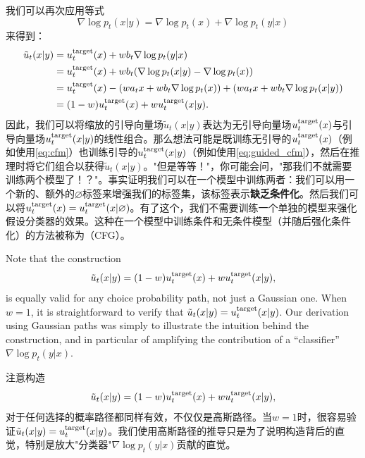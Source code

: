 我们可以再次应用等式$$\nabla \log p_t(x|y) = \nabla \log p_t(x) + \nabla \log p_t(y|x)$$来得到：
\begin{align*}\tilde{u}_t(x|y) &= u^{\text{target}}_t(x) + w b_t \nabla \log p_t(y|x)\\
&= u^{\text{target}}_t(x) + w b_t (\nabla \log p_t(x|y) - \nabla \log p_t(x))\\
&= u^{\text{target}}_t(x) - (w a_tx + w b_t \nabla \log p_t(x)) + (w a_t x + w b_t \nabla \log p_t(x|y))\\
&= (1-w) u^{\text{target}}_t(x) + w u^{\text{target}}_t(x|y).\end{align*}
因此，我们可以将缩放的引导向量场$\tilde{u}_t(x|y)$表达为无引导向量场$u^{\text{target}}_t(x)$与引导向量场$u^{\text{target}}_t(x|y)$的线性组合。那么想法可能是既训练无引导的$u^{\text{target}}_t(x)$（例如使用\cref{eq:cfm}）也训练引导的$u^{\text{target}}_t(x|y)$（例如使用\cref{eq:guided_cfm}），然后在推理时将它们组合以获得$\tilde{u}_t(x|y)$。"但是等等！"，你可能会问，"那我们不就需要训练两个模型了！？"。事实证明我们可以在一个模型中训练两者：我们可以用一个新的、额外的$\varnothing$标签来增强我们的标签集，该标签表示\textbf{缺乏条件化}。然后我们可以将$u^{\text{target}}_t(x)=u^{\text{target}}_t(x|\varnothing)$。有了这个，我们不需要训练一个单独的模型来强化假设分类器的效果。这种在一个模型中训练条件和无条件模型（并随后强化条件化）的方法被称为（CFG）\cite{cfg}。 

\begin{remarkbox}
Note that the construction
\begin{equation*}
    \tilde{u}_t(x|y) = (1-w) u^{\text{target}}_t(x) + w u^{\text{target}}_t(x|y),
\end{equation*}
is equally valid for any choice probability path, not just a Gaussian one. When $w=1$, it is straightforward to verify that $\tilde{u}_t(x|y)=u^{\text{target}}_t(x|y)$. Our derivation using Gaussian paths was simply to illustrate the intuition behind the construction, and in particular of amplifying the contribution of a ``classifier'' $\nabla \log p_t(y|x)$.
\end{remarkbox}
\begin{remarkbox}[一般概率路径的推导]
注意构造
\begin{equation*}
    \tilde{u}_t(x|y) = (1-w) u^{\text{target}}_t(x) + w u^{\text{target}}_t(x|y),
\end{equation*}
对于任何选择的概率路径都同样有效，不仅仅是高斯路径。当$w=1$时，很容易验证$\tilde{u}_t(x|y)=u^{\text{target}}_t(x|y)$。我们使用高斯路径的推导只是为了说明构造背后的直觉，特别是放大"分类器"$\nabla \log p_t(y|x)$贡献的直觉。
\end{remarkbox}

